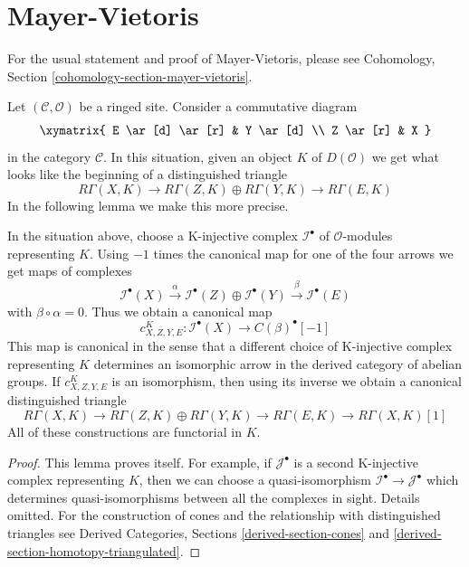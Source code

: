 \section{Mayer-Vietoris}
\label{section-mayer-vietoris}

\noindent
For the usual statement and proof of Mayer-Vietoris, please
see Cohomology, Section \ref{cohomology-section-mayer-vietoris}.

\medskip\noindent
Let $(\mathcal{C}, \mathcal{O})$ be a ringed site. Consider a
commutative diagram
$$
\xymatrix{
E \ar[d] \ar[r] & Y \ar[d] \\
Z \ar[r] & X
}
$$
in the category $\mathcal{C}$. In this situation, given an object
$K$ of $D(\mathcal{O})$ we get what looks like the
beginning of a distinguished triangle
$$
R\Gamma(X, K) \to
R\Gamma(Z, K) \oplus
R\Gamma(Y, K) \to
R\Gamma(E, K)
$$
In the following lemma we make this more precise.

\begin{lemma}
\label{lemma-c-square}
In the situation above, choose a K-injective complex $\mathcal{I}^\bullet$
of $\mathcal{O}$-modules representing $K$. Using $-1$ times the canonical map
for one of the four arrows we get maps of complexes
$$
\mathcal{I}^\bullet(X) \xrightarrow{\alpha}
\mathcal{I}^\bullet(Z) \oplus
\mathcal{I}^\bullet(Y) \xrightarrow{\beta}
\mathcal{I}^\bullet(E)
$$
with $\beta \circ \alpha = 0$. Thus we obtain a canonical map
$$
c^K_{X, Z, Y, E} :
\mathcal{I}^\bullet(X)
\longrightarrow
C(\beta)^\bullet[-1]
$$
This map is canonical in the sense that a different choice
of K-injective complex representing $K$ determines an isomorphic
arrow in the derived category of abelian groups. If $c^K_{X, Z, Y, E}$
is an isomorphism, then using its inverse we obtain a canonical
distinguished triangle
$$
R\Gamma(X, K) \to
R\Gamma(Z, K) \oplus
R\Gamma(Y, K) \to
R\Gamma(E, K) \to
R\Gamma(X, K)[1]
$$
All of these constructions are functorial in $K$.
\end{lemma}

\begin{proof}
This lemma proves itself. For example, if $\mathcal{J}^\bullet$
is a second K-injective complex representing $K$, then
we can choose a quasi-isomorphism
$\mathcal{I}^\bullet \to \mathcal{J}^\bullet$
which determines quasi-isomorphisms between all the complexes
in sight. Details omitted. For the construction of cones
and the relationship with distinguished triangles see
Derived Categories, Sections \ref{derived-section-cones} and
\ref{derived-section-homotopy-triangulated}.
\end{proof}

